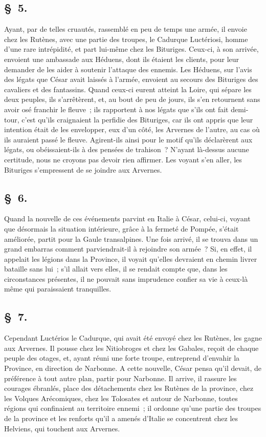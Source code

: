 \documentclass[french,twoside]{book} %
\begin{document}
\subsection[{§ 5.}]{ \textsc{§ 5.} }
\noindent Ayant, par de telles cruautés, rassemblé en peu de temps une armée, il envoie chez les Rutènes, avec une partie des troupes, le Cadurque Luctériosi, homme d’une rare intrépidité, et part lui-même chez les Bituriges. Ceux-ci, à son arrivée, envoient une ambassade aux Héduens, dont ils étaient les clients, pour leur demander de les aider à soutenir l’attaque des ennemis. Les Héduens, sur l’avis des légats que César avait laissés à l’armée, envoient au secours des Bituriges des cavaliers et des fantassins. Quand ceux-ci eurent atteint la Loire, qui sépare les deux peuples, ils s’arrêtèrent, et, au bout de peu de jours, ils s’en retournent sans avoir osé franchir le fleuve ; ils rapportent à nos légats que s’ils ont fait demi-tour, c’est qu’ils craignaient la perfidie des Bituriges, car ils ont appris que leur intention était de les envelopper, eux d’un côté, les Arvernes de l’autre, au cas où ils auraient passé le fleuve. Agirent-ils ainsi pour le motif qu’ils déclarèrent aux légats, ou obéissaient-ils à des pensées de trahison ? N'ayant là-dessus aucune certitude, nous ne croyons pas devoir rien affirmer. Les voyant s’en aller, les Bituriges s’empressent de se joindre aux Arvernes.
\subsection[{§ 6.}]{ \textsc{§ 6.} }
\noindent Quand la nouvelle de ces événements parvint en Italie à César, celui-ci, voyant que désormais la situation intérieure, grâce à la fermeté de Pompée, s’était améliorée, partit pour la Gaule transalpines. Une fois arrivé, il se trouva dans un grand embarras comment parviendrait-il à rejoindre son armée ? Si, en effet, il appelait les légions dans la Province, il voyait qu’elles devraient en chemin livrer bataille sans lui ; s’il allait vers elles, il se rendait compte que, dans les circonstances présentes, il ne pouvait sans imprudence confier sa vie à ceux-là même qui paraissaient tranquilles.
\subsection[{§ 7.}]{ \textsc{§ 7.} }
\noindent Cependant Luctérios le Cadurque, qui avait été envoyé chez les Rutènes, les gagne aux Arvernes. Il pousse chez les Nitiobroges et chez les Gabales, reçoit de chaque peuple des otages, et, ayant réuni une forte troupe, entreprend d’envahir la Province, en direction de Narbonne. A cette nouvelle, César pensa qu’il devait, de préférence à tout autre plan, partir pour Narbonne. Il arrive, il rassure les courages ébranlés, place des détachements chez les Rutènes de la province, chez les Volques Arécomiques, chez les Tolosates et autour de Narbonne, toutes régions qui confinaient au territoire ennemi ; il ordonne qu’une partie des troupes de la province et les renforts qu’il a amenés d’Italie se concentrent chez les Helviens, qui touchent aux Arvernes.
\end{document}
